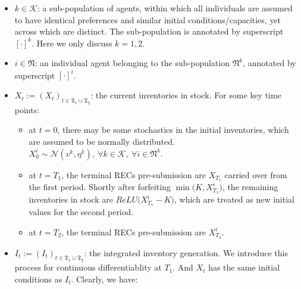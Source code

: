 \documentclass[a4paper,10pt]{article}
\newcommand{\1}{\mathbf{1}}
\begin{document}
\begin{itemize}
\item
  \(k \in \mathcal{K}\): a sub-population of agents, within which all
  individuals are assumed to have identical preferences and similar
  initial conditions/capacities, yet across which are distinct. The
  sub-population is annotated by superscript \([\cdot]^{k}\). Here we
  only discuss \(k=1,2\).
\item
  \(i \in \mathfrak{N}\): an individual agent belonging to the
  sub-population \(\mathfrak{N}^k\), annotated by superscript
  \([\cdot]^{i}\).
\item
  \(X_t := (X_t)_{t\in\mathfrak{T_1} \cup \mathfrak{T_2}}\): the current
  inventories in stock. For some key time points:

  \begin{itemize}
  \tightlist
  \item
    at \(t=0\), there may be some stochastics in the initial
    inventories, which are assumed to be normally distributed.
    \(X_0^{i} \sim \mathcal{N}(v^k, \eta^k) ,~ \forall k \in \mathcal{K},~\forall i \in \mathfrak{N}^k\).
  \item
    at \(t=T_1\), the terminal RECs pre-submission are \(X_{T_1}\)
    carried over from the first period. Shortly after forfeiting
    \(\min\Big(K,X^i_{T_1}\Big)\), the remaining inventories in stock
    are \(ReLU\Big(X^i_{T_1}-K\Big)\), which are treated as new initial
    values for the second period.
  \item
    at \(t=T_2\), the terminal RECs pre-submission are \(X^i_{T_2}\).
  \end{itemize}
\item
  \(I_t := (I_t)_{t\in\mathfrak{T_1} \cup \mathfrak{T_2}}\): the
  integrated inventory generation. We introduce this process for
  continuous differentiablity at \(T_1\). And \(X_t\) has the same
  initial conditions as \(I_t\). Clearly, we have:


\end{itemize}
\end{document}
